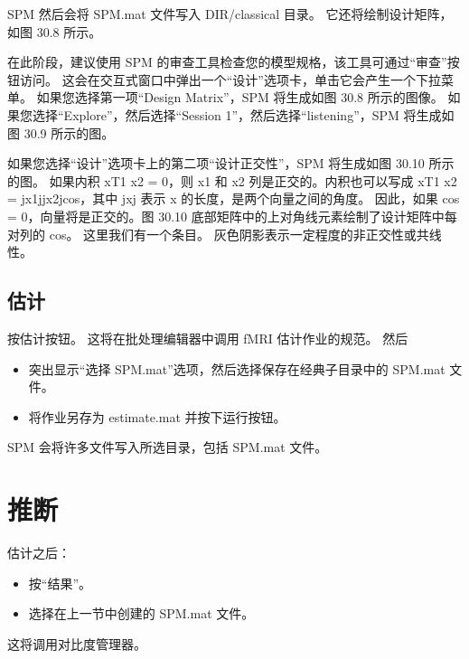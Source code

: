 SPM 然后会将 SPM.mat 文件写入 DIR/classical 目录。 它还将绘制设计矩阵，如图 30.8 所示。

在此阶段，建议使用 SPM 的审查工具检查您的模型规格，该工具可通过“审查”按钮访问。 这会在交互式窗口中弹出一个“设计”选项卡，单击它会产生一个下拉菜单。 如果您选择第一项“Design Matrix”，SPM 将生成如图 30.8 所示的图像。 如果您选择“Explore”，然后选择“Session 1”，然后选择“listening”，SPM 将生成如图 30.9 所示的图。

如果您选择“设计”选项卡上的第二项“设计正交性”，SPM 将生成如图 30.10 所示的图。 如果内积 xT1 x2 = 0，则 x1 和 x2 列是正交的。内积也可以写成 xT1 x2 = jx1jjx2jcos，其中 jxj 表示 x 的长度，是两个向量之间的角度。 因此，如果 cos = 0，向量将是正交的。图 30.10 底部矩阵中的上对角线元素绘制了设计矩阵中每对列的 cos。 这里我们有一个条目。 灰色阴影表示一定程度的非正交性或共线性。

\subsection{估计}
按估计按钮。 这将在批处理编辑器中调用 fMRI 估计作业的规范。 然后

\begin{itemize}
	\item 突出显示“选择 SPM.mat”选项，然后选择保存在经典子目录中的 SPM.mat 文件。
	\item 将作业另存为 estimate.mat 并按下运行按钮。
\end{itemize}

SPM 会将许多文件写入所选目录，包括 SPM.mat 文件。




\section{推断}

估计之后：
\begin{itemize}
	\item 按“结果”。
	\item 选择在上一节中创建的 SPM.mat 文件。
\end{itemize}

这将调用对比度管理器。

